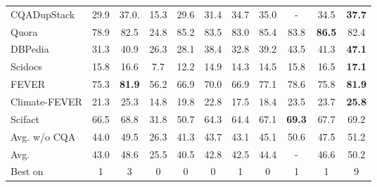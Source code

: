 \documentclass[10pt]{article} %
\begin{document}
\begin{table}[t!]
{\begin{tabular}{@{}l  cccccccc >{\columncolor{bluegrey}}c >{\columncolor{bluegrey}}c}
CQADupStack     & 29.9          & 37.0.         & 15.3          & 29.6          & 31.4          & 34.7          & 35.0          & -             & 34.5          & \textbf{37.7}          \\
Quora           & 78.9          & 82.5          & 24.8          & 85.2          & 83.5          & 83.0          & 85.4          & 83.8          & \textbf{86.5} & 82.4          \\
DBPedia         & 31.3          & 40.9          & 26.3          & 28.1          & 38.4          & 32.8          & 39.2          & 43.5          & 41.3          & \textbf{47.1} \\
Scidocs         & 15.8          & 16.6          & 7.7          & 12.2          & 14.9          & 14.3          & 14.5          & 15.8          & 16.5          & \textbf{17.1} \\
FEVER           & 75.3          & \textbf{81.9} & 56.2          & 66.9          & 70.0          & 66.9          & 77.1          & 78.6          & 75.8          & \textbf{81.9} \\
Climate-FEVER   & 21.3          & 25.3          & 14.8          & 19.8          & 22.8          & 17.5          & 18.4          & 23.5          & 23.7          & \textbf{25.8} \\
Scifact         & 66.5          & 68.8          & 31.8          & 50.7          & 64.3          & 64.4          & 67.1          & \textbf{69.3} & 67.7          & 69.2          \\
\midrule

Avg. w/o CQA            & 44.0          & 49.5          & 26.3          & 41.3          & 43.7          & 43.1          & 45.1          & 50.6          & 47.5          & 51.2          \\ %
Avg.            & 43.0          & 48.6         & 25.5          & 40.5         & 42.8          & 42.5          & 44.4          & -          & 46.6          & 50.2          \\ %
Best on         & 1             & 3             & 0             & 0             & 0             & 1             & 0             & 1             & 1             & 9             \\
\bottomrule
\end{tabular}}
\end{table}
\end{document}

